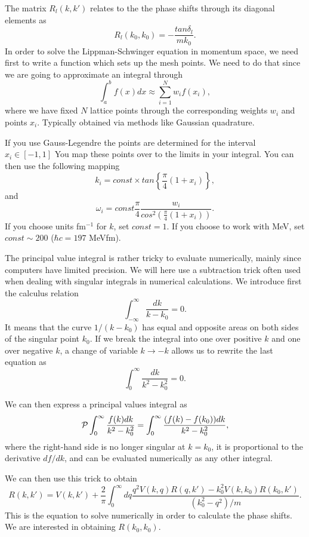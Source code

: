 \documentclass[%
twoside,                 %
final,                   %
10pt]{article}
\newenvironment{doconceexercise}{}{}
\begin{document}
\begin{doconceexercise}
The matrix $R_l(k,k')$ relates to the 
the  phase shifts through its diagonal elements as
\begin{equation}
     R_l(k_0,k_0)=-\frac{tan\delta_l}{mk_0}.
     \label{eq:shifts}
\end{equation}
In order to solve the Lippman-Schwinger equation 
in momentum space, we need first to write 
a function which sets up the mesh points. 
We need to do that since we are going to approximate an integral
through 
\[
   \int_a^bf(x)dx\approx\sum_{i=1}^Nw_if(x_i),
\]
where we have fixed $N$ lattice points through the corresponding weights
$w_i$ and points $x_i$. Typically obtained via methods like Gaussian quadrature.

If you use Gauss-Legendre the points are determined for the interval $x_i\in [-1,1]$
You map these points over to the limits in your integral. You can then
use the following mapping
\[
  k_i=const\times tan\left\{\frac{\pi}{4}(1+x_i)\right\},
\]
and 
\[
   \omega_i= const\frac{\pi}{4}\frac{w_i}{cos^2\left(\frac{\pi}{4}(1+x_i)\right)}.
\]
If you choose units fm$^{-1}$ for $k$, set $const=1$. If you choose to work
with MeV, set $const\sim 200$ ($\hbar c=197$ MeVfm).

The principal value integral is rather tricky
to evaluate numerically, mainly since computers have limited
precision. We will here use a subtraction trick often used
when dealing with singular integrals in numerical calculations.
We introduce first the calculus relation
\[
  \int_{-\infty}^{\infty} \frac{dk}{k-k_0} =0.
\]
It means that the curve $1/(k-k_0)$ has equal and opposite
areas on both sides of the singular point $k_0$. If we break
the integral into one over positive $k$ and one over 
negative $k$, a change of variable $k\rightarrow -k$ 
allows us to rewrite the last equation as
\[
  \int_{0}^{\infty} \frac{dk}{k^2-k_0^2} =0.
\]

We can then express a principal values integral
as
\begin{equation}
  {\cal P}\int_{0}^{\infty} \frac{f(k)dk}{k^2-k_0^2} =
  \int_{0}^{\infty} \frac{(f(k)-f(k_0))dk}{k^2-k_0^2},
   \label{eq:trick}
\end{equation}
where the right-hand side is no longer singular at 
$k=k_0$, it is proportional to the derivative $df/dk$,
and can be evaluated numerically as any other integral.


We can then use this trick to obtain
\begin{equation}
    R(k,k') = V(k,k') +\frac{2}{\pi}
                \int_0^{\infty}dq
                \frac{q^2V(k,q)R(q,k')-k_0^2V(k,k_0)R(k_0,k')  }
                     {(k_0^2-q^2)/m}.
   \label{eq:ls2}
\end{equation}
This is the equation to solve numerically in order
to calculate the phase shifts. We are interested in obtaining
$R(k_0,k_0)$.


\end{doconceexercise}
\end{document}
